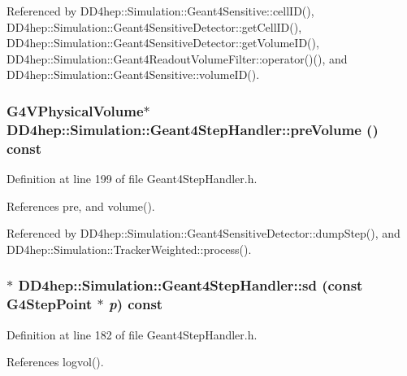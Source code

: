 Referenced by DD4hep::Simulation::Geant4Sensitive::cellID(), DD4hep::Simulation::Geant4SensitiveDetector::getCellID(), DD4hep::Simulation::Geant4SensitiveDetector::getVolumeID(), DD4hep::Simulation::Geant4ReadoutVolumeFilter::operator()(), and DD4hep::Simulation::Geant4Sensitive::volumeID().\hypertarget{class_d_d4hep_1_1_simulation_1_1_geant4_step_handler_a39eab28ff81a1a24daea4b6a1e376dea}{
\subsubsection[{preVolume}]{\setlength{\rightskip}{0pt plus 5cm}G4VPhysicalVolume$\ast$ DD4hep::Simulation::Geant4StepHandler::preVolume () const}}
\label{class_d_d4hep_1_1_simulation_1_1_geant4_step_handler_a39eab28ff81a1a24daea4b6a1e376dea}


Definition at line 199 of file Geant4StepHandler.h.

References pre, and volume().

Referenced by DD4hep::Simulation::Geant4SensitiveDetector::dumpStep(), and DD4hep::Simulation::TrackerWeighted::process().\hypertarget{class_d_d4hep_1_1_simulation_1_1_geant4_step_handler_a6b7355a5af216dddcf41af1c1d9e2b8d}{
\subsubsection[{sd}]{$\ast$ DD4hep::Simulation::Geant4StepHandler::sd (const G4StepPoint $\ast$ {\em p}) const}}
\label{class_d_d4hep_1_1_simulation_1_1_geant4_step_handler_a6b7355a5af216dddcf41af1c1d9e2b8d}


Definition at line 182 of file Geant4StepHandler.h.

References logvol().

